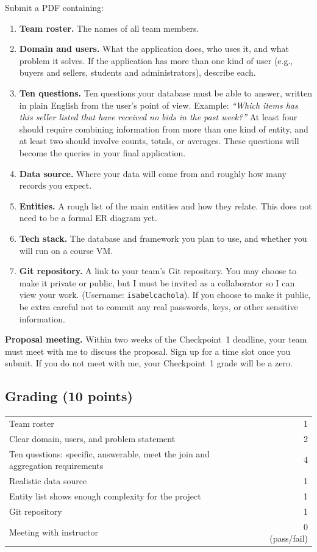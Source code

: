 \documentclass[11pt]{article}
\begin{document}
Submit a PDF containing:
\begin{enumerate}
  \item \textbf{Team roster.} The names of all team members.
  \item \textbf{Domain and users.} What the application does, who uses it, and what problem it solves. If the application has more than one kind of user (e.g., buyers and sellers, students and administrators), describe each.
  \item \textbf{Ten questions.} Ten questions your database must be able to answer, written in plain English from the user's point of view. Example: \emph{``Which items has this seller listed that have received no bids in the past week?''} 
                                At least four should require combining information from more than one kind of entity, and at least two should involve counts, totals, or averages. These questions will become the queries in your final application.
  \item \textbf{Data source.} Where your data will come from and roughly how many records you expect.
  \item \textbf{Entities.} A rough list of the main entities and how they relate. This does not need to be a formal ER diagram yet.
  \item \textbf{Tech stack.} The database and framework you plan to use, and whether you will run on a course VM.
  \item \textbf{Git repository.} A link to your team's Git repository. You may choose to make it private or public, but I must be invited as a collaborator so I can view your work. (Username: \texttt{isabelcachola}). If you choose to make it public, be extra careful not to commit any real passwords, keys, or other sensitive information.
\end{enumerate}

\noindent\textbf{Proposal meeting.} Within two weeks of the Checkpoint~1 deadline, your team must meet with me to discuss the proposal. Sign up for a time slot once you submit.
If you do not meet with me, your Checkpoint~1 grade will be a zero.

\subsection*{Grading (10 points)}
\begin{tabularx}{\textwidth}{@{}Xr@{}}
Team roster & 1 \\
Clear domain, users, and problem statement & 2 \\
Ten questions: specific, answerable, meet the join and aggregation requirements & 4 \\
Realistic data source & 1 \\
Entity list shows enough complexity for the project & 1 \\
Git repository & 1 \\
Meeting with instructor & 0 (pass/fail) \\
\end{tabularx}
\end{document}
